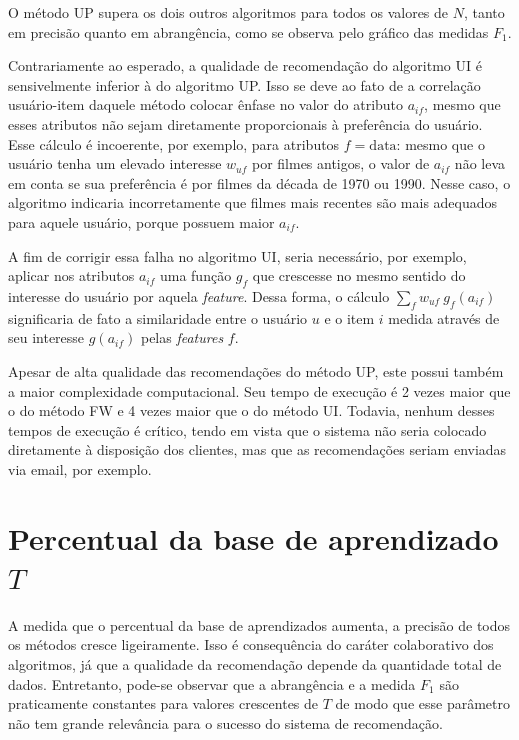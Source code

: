 O método UP supera os dois outros algoritmos para todos os valores de $N$, tanto em precisão quanto em abrangência, como se observa pelo gráfico das medidas $F_1$.


Contrariamente ao esperado, a qualidade de recomendação do algoritmo UI é sensivelmente inferior à do algoritmo UP. Isso se deve ao fato de a correlação usuário-item daquele método colocar ênfase no valor do atributo $a_{if}$, mesmo que esses atributos não sejam diretamente proporcionais à preferência do usuário. Esse cálculo é incoerente, por exemplo, para atributos $f=\mathrm{data}$: mesmo que o usuário tenha um elevado interesse $w_{uf}$ por filmes antigos, o valor de $a_{if}$ não leva em conta se sua preferência é por filmes da década de 1970 ou 1990. Nesse caso, o algoritmo indicaria incorretamente que filmes mais recentes são mais adequados para aquele usuário, porque possuem maior $a_{if}$.

A fim de corrigir essa falha no algoritmo UI, seria necessário, por exemplo, aplicar nos atributos $a_{if}$ uma função $g_f$ que crescesse no mesmo sentido do interesse do usuário por aquela \textit{feature}. Dessa forma, o cálculo $\sum_f w_{uf}~g_f\left(a_{if}\right)$ significaria de fato a similaridade entre o usuário $u$ e o item $i$ medida através de seu interesse $g\left(a_{if}\right)$ pelas \textit{features} $f$.

Apesar de alta qualidade das recomendações do método UP, este possui também a maior complexidade computacional. Seu tempo de execução é 2 vezes maior que o do método FW e 4 vezes maior que o do método UI. Todavia, nenhum desses tempos de execução é crítico, tendo em vista que o sistema não seria colocado diretamente à disposição dos clientes, mas que as recomendações seriam enviadas via email, por exemplo. 


\section{Percentual da base de aprendizado $T$} %
\label{sec:percentual_da_base_de_aprendizado_}

A medida que o percentual da base de aprendizados aumenta, a precisão de todos os métodos cresce ligeiramente. Isso é consequência do caráter colaborativo dos algoritmos, já que a qualidade da recomendação depende da quantidade total de dados. Entretanto, pode-se observar que a abrangência e a medida $F_1$ são praticamente constantes para valores crescentes de $T$ de modo que esse parâmetro não tem grande relevância para o sucesso do sistema de recomendação.

